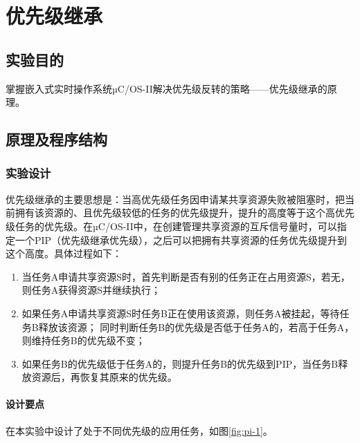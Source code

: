 \documentclass{ctexart}
\begin{document}
    \section{优先级继承}
    
    \subsection{实验目的}
    
    掌握嵌入式实时操作系统µC/OS-II解决优先级反转的策略——优先级继承的原理。
    
    \subsection{原理及程序结构}
    
    \subsubsection{实验设计}
    
    优先级继承的主要思想是：当高优先级任务因申请某共享资源失败被阻塞时，把当前拥有该资源的、且优先级较低的任务的优先级提升，提升的高度等于这个高优先级任务的优先级。在µC/OS-II中，在创建管理共享资源的互斥信号量时，可以指定一个PIP（优先级继承优先级），之后可以把拥有共享资源的任务优先级提升到这个高度。具体过程如下：
    \begin{enumerate}
        \item 当任务A申请共享资源S时，首先判断是否有别的任务正在占用资源S，若无，则任务A获得资源S并继续执行；
        \item 如果任务A申请共享资源S时任务B正在使用该资源，则任务A被挂起，等待任务B释放该资源；
            同时判断任务B的优先级是否低于任务A的，若高于任务A，则维持任务B的优先级不变；
        \item 如果任务B的优先级低于任务A的，则提升任务B的优先级到PIP，当任务B释放资源后，再恢复其原来的优先级。
    \end{enumerate}
    
    \paragraph{设计要点}
    
    在本实验中设计了处于不同优先级的应用任务，如图\ref{fig:pi-1}。
    
\end{document}

